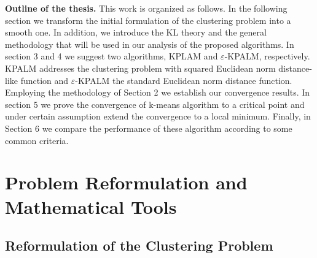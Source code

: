 \documentclass[12pt]{article}
\numberwithin{equation}{section}
\begin{document}
\noindent \textbf{Outline of the thesis.} This work is organized as follows. In the following section we transform the initial formulation  of the clustering problem into a smooth one. In addition, we introduce 
the KL theory and the general methodology that will be used in our analysis of the proposed algorithms. In section 3 and 4 we suggest two algorithms, KPLAM and $\varepsilon$-KPALM, respectively. KPALM addresses the clustering problem with squared Euclidean norm distance-like function and $\varepsilon$-KPALM the standard Euclidean norm distance function. Employing the methodology of Section 2 we establish our convergence results.  In section 5 we prove the convergence of k-means algorithm to a critical point and under certain assumption extend the convergence to a local minimum. Finally, in Section 6 we compare the performance of these algorithm according to some common criteria.

\section{Problem Reformulation and Mathematical Tools}

\subsection{Reformulation of the Clustering Problem} \label{State_Clustering_Reformulation}
\end{document}
